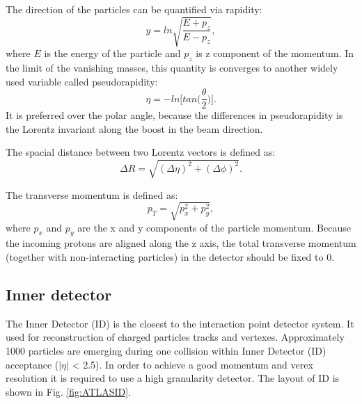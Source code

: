 The direction of the particles can be quantified via rapidity:
\begin{equation}
y = ln \sqrt{\frac{E+p_z}{E-p_z}},
\end{equation}
where $E$ is the energy of the particle and $p_{z}$ is z component of the momentum. In the limit of the vanishing masses, this quantity is converges to another widely used variable called pseudorapidity:
\begin{equation}
\eta = - ln \Big[tan\Big(\frac{\theta}{2}\Big)\Big].
\end{equation}
It is preferred over the polar angle, because the differences in pseudorapidity is the Lorentz invariant along the boost in the beam direction. 

The spacial distance between two Lorentz vectors is defined as:
\begin{equation}
\Delta R = \sqrt{(\Delta\eta)^2+(\Delta\phi)^2}.
\end{equation}

The transverse momentum is defined as:
\begin{equation}
p_T=\sqrt{p_x^2+p_y^2},
\end{equation}
where $p_x$ and $p_y$ are the x and y components of the particle momentum. Because the incoming protons are aligned along the z axis, the total transverse momentum (together with non-interacting particles) in the detector should be fixed to 0. 

\subsection{Inner detector}

\begin{figure}[!tbp]
\end{figure}

The Inner Detector (ID) is the closest to the interaction point detector system. It used for reconstruction of charged particles tracks and vertexes.  Approximately 1000 particles are emerging during one collision within Inner Detector (ID) acceptance ($| \eta |$ < 2.5). In order to achieve a good momentum and verex resolution it is required to use a high granularity detector. The layout of ID is shown in Fig. \ref{fig:ATLASID}. 

